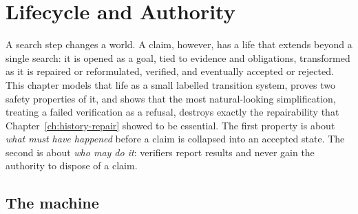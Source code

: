 \chapter{Lifecycle and Authority}
\label{ch:lifecycle}

A search step changes a world. A claim, however, has a life that extends beyond a single search: it is opened as a goal, tied to evidence and obligations, transformed as it is repaired or reformulated, verified, and eventually accepted or rejected. This chapter models that life as a small labelled transition system, proves two safety properties of it, and shows that the most natural-looking simplification, treating a failed verification as a refusal, destroys exactly the repairability that Chapter~\ref{ch:history-repair} showed to be essential. The first property is about \emph{what must have happened} before a claim is collapsed into an accepted state. The second is about \emph{who may do it}: verifiers report results and never gain the authority to dispose of a claim.

\section{The machine}


